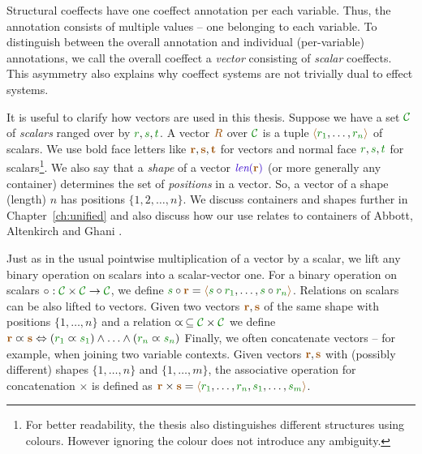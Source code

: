 Structural coeffects have one coeffect annotation per each variable. Thus, the annotation consists
of multiple values -- one belonging to each variable. To distinguish between the overall annotation
and individual (per-variable) annotations, we call the overall coeffect a \emph{vector} consisting of 
\emph{scalar} coeffects. This asymmetry also explains why coeffect systems are not trivially dual to 
effect systems.

It is useful to clarify how vectors are used in this thesis. Suppose we have a set $\C$ of
\emph{scalars} ranged over by $\cclrd{r},\cclrd{s},\cclrd{t}$. A vector $\aclrd{R}$ 
over $\C$ is a tuple $\alift{ \cclrd{r_1}, \ldots, \cclrd{r_n} }$ of scalars. 
We use bold face letters like $\aclrd{\textbf{r}}, \aclrd{\textbf{s}}, \aclrd{\textbf{t}}$ for vectors and 
normal face $\cclrd{r},\cclrd{s},\cclrd{t}$ for scalars\footnote{For better readability, the thesis
also distinguishes different structures using colours. However ignoring the colour does not introduce 
any ambiguity.}. We also say that a \emph{shape} of a vector $\slen{\aclrd{\textbf{r}}}$ (or more generally any container) 
determines the set of \emph{positions} in a vector. So, a vector of a shape (length) $n$ has positions 
$\{ 1, 2, \ldots, n \}$. We discuss containers and shapes further in Chapter~\ref{ch:unified} and also 
discuss how our use relates to containers of Abbott, Altenkirch and Ghani \cite{types-containers}.

Just as in the usual pointwise multiplication of a vector by a scalar, we lift any binary operation on scalars into a 
scalar-vector one. For a binary operation on scalars $\circ : \C \times \C \rightarrow \C$, we define
 $\cclrd{s} \circ \aclrd{\textbf{r}} = \alift{ \cclrd{s}\circ\cclrd{r_1}, \ldots, \cclrd{s}\circ\cclrd{r_n}}$.
Relations on scalars can be also lifted to vectors. Given two vectors $\aclrd{\textbf{r}}, \aclrd{\textbf{s}}$ of the
same shape with positions $\{ 1, \ldots, n \}$ and a relation $\varpropto\, \subseteq \C \times \C$ we define 
$\aclrd{\textbf{r}} \varpropto \aclrd{\textbf{s}} \Leftrightarrow (\cclrd{r_1} \varpropto \cclrd{s_1}) \wedge \ldots \wedge (\cclrd{r_n} \varpropto \cclrd{s_n}) $
Finally, we often concatenate vectors -- for example, when joining two variable contexts.
Given vectors $\aclrd{\textbf{r}}, \aclrd{\textbf{s}}$ with (possibly different) shapes $\{ 1, \ldots, n \}$ and 
$\{ 1, \ldots, m \}$, the associative operation for concatenation $\times$ is defined as 
$\aclrd{\textbf{r}}\times\aclrd{\textbf{s}} = \alift{\cclrd{r_1},\ldots,\cclrd{r_n},\cclrd{s_1},\ldots,\cclrd{s_m}}$.

